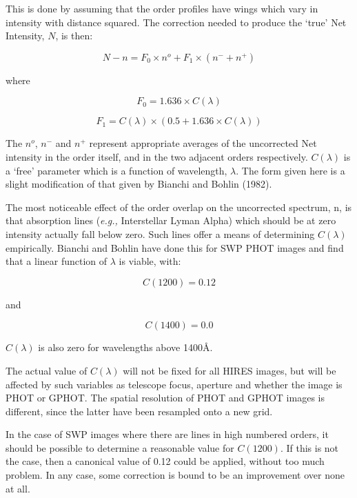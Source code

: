 This is done by assuming that the order profiles have wings which vary in
intensity with distance squared. The correction needed to produce the `true'
Net Intensity, $N$, is then:

\begin{displaymath}
N - n = F_{0} \times n^{o} + F_{1} \times (n^{-} + n^{+})
\end{displaymath}

where

\begin{displaymath}
F_{0} = 1.636 \times C(\lambda)
\end{displaymath}

\begin{displaymath}
F_{1} = C(\lambda) \times (0.5 + 1.636 \times C(\lambda))
\end{displaymath}

The $n^{o}$, $n^{-}$ and $n^{+}$ represent appropriate averages of
the uncorrected Net intensity in the order itself, and in the two adjacent
orders respectively.  $C(\lambda)$ is a `free' parameter which is a function of
wavelength, $\lambda$\@.  The form given here is a slight modification of that
given by Bianchi and Bohlin (1982)\@.

The most noticeable effect of the order overlap on the uncorrected
spectrum, n, is that absorption lines ({\it{e.g.,}} Interstellar Lyman Alpha)
which should be at zero intensity actually fall below zero.  Such lines offer
a means of determining $C(\lambda)$ empirically.  Bianchi and Bohlin have done
this for SWP PHOT images and find that a linear function of $\lambda$ is
viable, with:

\begin{displaymath}
C(1200) = 0.12
\end{displaymath}

and

\begin{displaymath}
C(1400) = 0.0
\end{displaymath}

$C(\lambda)$ is also zero for wavelengths above 1400\AA\@.

The actual value of $C(\lambda)$ will not be fixed for all HIRES images, but
will be affected by such variables as telescope focus, aperture and whether
the image is PHOT or GPHOT\@.  The spatial resolution of PHOT and GPHOT images
is different, since the latter have been resampled onto a new grid.

In the case of SWP images where there are lines in high numbered orders, it
should be possible to determine a reasonable value for $C(1200)$\@.  If this
is not the case, then a canonical value of 0.12 could be applied, without
too much problem.  In any case, some correction is bound to be an
improvement over none at all.

